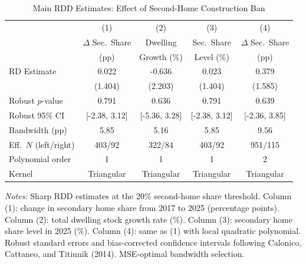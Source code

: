 \begin{table}[htbp]
\centering
\begin{threeparttable}
\caption{Main RDD Estimates: Effect of Second-Home Construction Ban}
\label{tab:main}
\begin{tabular}{lcccc}
\toprule
 & (1) & (2) & (3) & (4) \\
 & $\Delta$ Sec.\ Share & Dwelling & Sec.\ Share & $\Delta$ Sec.\ Share \\
 & (pp) & Growth (\%) & Level (\%) & (pp) \\
\midrule
RD Estimate & 0.022 & -0.636 & 0.023 & 0.379 \\
 & (1.404) & (2.203) & (1.404) & (1.585) \\
Robust $p$-value & 0.791 & 0.636 & 0.791 & 0.639 \\
Robust 95\% CI & [-2.38, 3.12] & [-5.36, 3.28] & [-2.38, 3.12] & [-2.36, 3.85] \\
\midrule
Bandwidth (pp) & 5.85 & 5.16 & 5.85 & 9.56 \\
Eff.\ $N$ (left/right) & 403/92 & 322/84 & 403/92 & 951/115 \\
Polynomial order & 1 & 1 & 1 & 2 \\
Kernel & Triangular & Triangular & Triangular & Triangular \\
\bottomrule
\end{tabular}
\begin{tablenotes}[flushleft]
\small
\item \textit{Notes:} Sharp RDD estimates at the 20\% second-home share threshold. Column (1): change in secondary home share from 2017 to 2025 (percentage points). Column (2): total dwelling stock growth rate (\%). Column (3): secondary home share level in 2025 (\%). Column (4): same as (1) with local quadratic polynomial. Robust standard errors and bias-corrected confidence intervals following Calonico, Cattaneo, and Titiunik (2014). MSE-optimal bandwidth selection.
\end{tablenotes}
\end{threeparttable}
\end{table}
